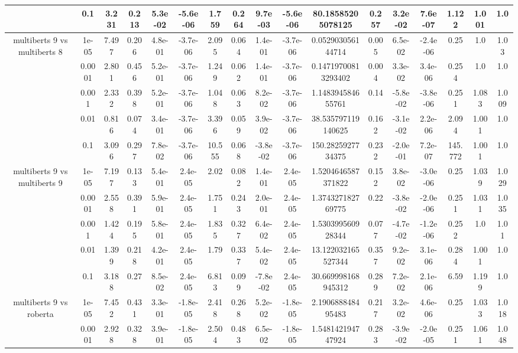 \begin{tabular}{|c|c|c|c|c|c|c|c|c|c|c|c|c|c|c|c|c|}
 & 0.1 & 3.231 & 0.213 & 5.3e-02 & -5.6e-06 & 1.759 & 0.264 & 9.7e-03 & -5.6e-06 & 80.18585205078125 & 0.257 & 3.2e-02 & 7.6e-07 & 1.122 & 1.001 & 1.0 \\
\hline
\multirow{5}{*}{multiberts 9 vs multiberts 8} & 1e-05 & 7.497 & 0.206 & 4.8e-01 & -3.7e-06 & 2.095 & 0.064 & 1.4e-01 & -3.7e-06 & 0.052903056144714 & 0.005 & 6.5e-02 & -2.4e-06 & 0.25 & 1.0 & 1.03 \\
 & 0.0001 & 2.801 & 0.456 & 5.2e-01 & -3.7e-06 & 1.249 & 0.062 & 1.4e-01 & -3.7e-06 & 0.14719700813293402 & 0.004 & 3.3e-02 & 3.4e-06 & 0.254 & 1.0 & 1.0 \\
 & 0.001 & 2.332 & 0.398 & 5.2e-01 & -3.7e-06 & 1.048 & 0.063 & 8.2e-02 & -3.7e-06 & 1.148394584655761 & 0.14 & -5.8e-02 & -3.8e-06 & 0.251 & 1.083 & 1.009 \\
 & 0.01 & 0.816 & 0.074 & 3.4e-01 & -3.7e-06 & 3.396 & 0.059 & 3.9e-02 & -3.7e-06 & 38.535797119140625 & 0.162 & -3.1e-02 & 2.2e-06 & 2.094 & 1.001 & 1.0 \\
 & 0.1 & 3.096 & 0.297 & 7.8e-02 & -3.7e-06 & 10.555 & 0.068 & -3.8e-02 & -3.7e-06 & 150.2825927734375 & 0.232 & -2.0e-01 & 7.2e-07 & 145.772 & 1.001 & 1.0 \\
\hline
\multirow{5}{*}{multiberts 9 vs multiberts 9} & 1e-05 & 7.197 & 0.133 & 5.4e-01 & 2.4e-05 & 2.02 & 0.082 & 1.4e-01 & 2.4e-05 & 1.5204646587371822 & 0.152 & 3.8e-02 & -3.0e-06 & 0.25 & 1.039 & 1.029 \\
 & 0.0001 & 2.558 & 0.391 & 5.9e-01 & 2.4e-05 & 1.751 & 0.243 & 2.0e-01 & 2.4e-05 & 1.374327182769775 & 0.22 & -3.8e-02 & -2.0e-06 & 0.251 & 1.031 & 1.035 \\
 & 0.001 & 1.424 & 0.195 & 5.8e-01 & 2.4e-05 & 1.835 & 0.327 & 6.4e-02 & 2.4e-05 & 1.530399560928344 & 0.077 & -4.7e-02 & -1.2e-06 & 0.252 & 1.0 & 1.01 \\
 & 0.01 & 1.399 & 0.218 & 4.2e-01 & 2.4e-05 & 1.79 & 0.337 & 5.4e-02 & 2.4e-05 & 13.122032165527344 & 0.357 & 9.2e-02 & 3.1e-06 & 0.284 & 1.001 & 1.0 \\
 & 0.1 & 3.188 & 0.27 & 8.5e-02 & 2.4e-05 & 6.813 & 0.099 & -7.8e-02 & 2.4e-05 & 30.669998168945312 & 0.289 & 7.2e-02 & 2.1e-06 & 6.59 & 1.199 & 1.0 \\
\hline
\multirow{5}{*}{multiberts 9 vs roberta } & 1e-05 & 7.452 & 0.431 & 3.3e-01 & -1.8e-05 & 2.418 & 0.268 & 5.2e-02 & -1.8e-05 & 2.190688848495483 & 0.217 & 3.2e-02 & 4.6e-06 & 0.25 & 1.033 & 1.018 \\
 & 0.0001 & 2.928 & 0.328 & 3.9e-01 & -1.8e-05 & 2.504 & 0.483 & 6.5e-02 & -1.8e-05 & 1.548142194747924 & 0.283 & -3.9e-02 & -2.0e-05 & 0.251 & 1.061 & 1.048 \\

\end{tabular}
